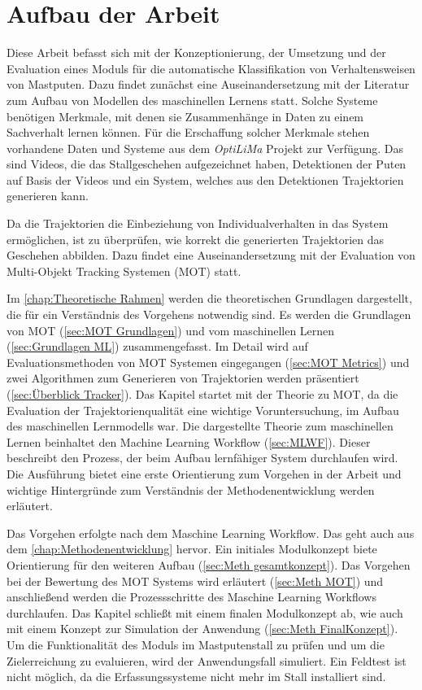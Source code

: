 \section{Aufbau der Arbeit}
Diese Arbeit befasst sich mit der Konzeptionierung, der Umsetzung und der Evaluation eines Moduls für die automatische Klassifikation von Verhaltensweisen von Mastputen. Dazu findet zunächst eine Auseinandersetzung mit der Literatur zum Aufbau von Modellen des maschinellen Lernens statt. Solche Systeme benötigen Merkmale, mit denen sie Zusammenhänge in Daten zu einem Sachverhalt lernen können. Für die Erschaffung solcher Merkmale stehen vorhandene Daten und Systeme aus dem \textit{\acrshort{OptiLiMa}} Projekt zur Verfügung. Das sind Videos, die das Stallgeschehen aufgezeichnet haben, Detektionen der Puten auf Basis der Videos und ein System, welches aus den Detektionen Trajektorien generieren kann.\par

Da die Trajektorien die Einbeziehung von Individualverhalten in das System ermöglichen, ist zu überprüfen, wie korrekt die generierten Trajektorien das Geschehen abbilden. Dazu  findet eine Auseinandersetzung mit der Evaluation von Multi-Objekt Tracking Systemen (MOT) statt.\par

Im \autoref{chap:Theoretische Rahmen} werden die theoretischen Grundlagen dargestellt, die für ein Verständnis des Vorgehens notwendig sind. Es werden die Grundlagen von MOT (\autoref{sec:MOT Grundlagen}) und vom maschinellen Lernen (\autoref{sec:Grundlagen ML}) zusammengefasst. Im Detail wird auf Evaluationsmethoden von MOT Systemen eingegangen (\autoref{sec:MOT Metrics}) und zwei Algorithmen zum Generieren von Trajektorien werden präsentiert (\autoref{sec:Überblick Tracker}). Das Kapitel startet mit der Theorie zu MOT, da die Evaluation der Trajektorienqualität eine wichtige Voruntersuchung, im Aufbau des maschinellen Lernmodells war. Die dargestellte Theorie zum maschinellen Lernen beinhaltet den Machine Learning Workflow (\autoref{sec:MLWF}). Dieser beschreibt den Prozess, der beim Aufbau lernfähiger System durchlaufen wird. Die Ausführung bietet eine erste Orientierung zum Vorgehen in der Arbeit und wichtige Hintergründe zum Verständnis der Methodenentwicklung werden erläutert. \par

Das Vorgehen erfolgte nach dem Maschine Learning Workflow. Das geht auch aus dem \autoref{chap:Methodenentwicklung} hervor. Ein initiales Modulkonzept biete Orientierung für den weiteren Aufbau (\autoref{sec:Meth gesamtkonzept}). Das Vorgehen bei der Bewertung des MOT Systems wird erläutert (\autoref{sec:Meth MOT}) und anschließend werden die Prozessschritte des Maschine Learning Workflows durchlaufen. Das Kapitel schließt mit einem finalen Modulkonzept ab, wie auch mit einem Konzept zur Simulation der Anwendung (\autoref{sec:Meth FinalKonzept}). Um die Funktionalität des Moduls im Mastputenstall zu prüfen und um die Zielerreichung zu evaluieren, wird der Anwendungsfall simuliert. Ein Feldtest ist nicht möglich, da die Erfassungssysteme nicht mehr im Stall installiert sind. \par

